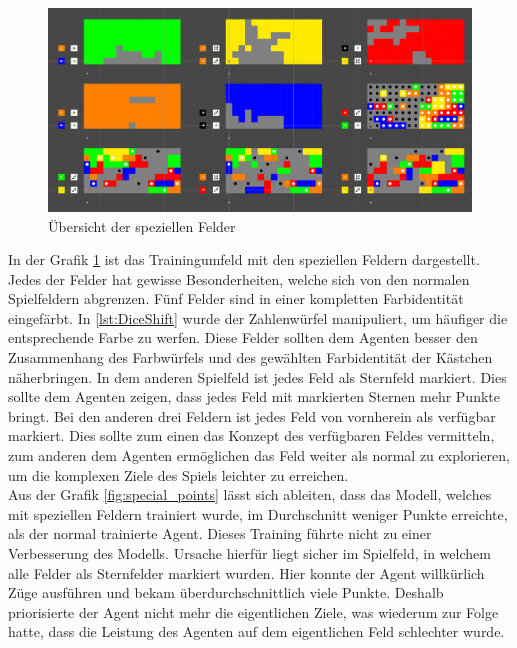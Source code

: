 \begin{figure}[!h]
    \centering
    \includegraphics[scale=0.4]{Bilder/specialFields.png}
    \caption{Übersicht der speziellen Felder}
    \label{fig:specialFields}
\end{figure}

In der Grafik \ref{fig:specialFields} ist das Trainingumfeld mit den speziellen Feldern dargestellt. Jedes der Felder hat gewisse Besonderheiten, welche sich von den normalen Spielfeldern abgrenzen.
Fünf Felder sind in einer kompletten Farbidentität eingefärbt. In \ref{lst:DiceShift} wurde der Zahlenwürfel manipuliert, um häufiger die entsprechende Farbe zu werfen. Diese Felder sollten dem Agenten besser den Zusammenhang des Farbwürfels und des gewählten Farbidentität der Kästchen näherbringen.
In dem anderen Spielfeld ist jedes Feld als Sternfeld markiert. Dies sollte dem Agenten zeigen, dass jedes Feld mit markierten Sternen mehr Punkte bringt.
Bei den anderen drei Feldern ist jedes Feld von vornherein als verfügbar markiert. Dies sollte zum einen das Konzept des verfügbaren Feldes vermitteln, zum anderen dem Agenten ermöglichen das Feld weiter als normal zu explorieren, um die komplexen Ziele des Spiels leichter zu erreichen. \\
Aus der Grafik \ref{fig:special_points} lässt sich ableiten, dass das Modell, welches mit speziellen Feldern trainiert wurde, im Durchschnitt weniger Punkte erreichte, als der normal trainierte Agent. Dieses Training führte nicht zu einer Verbesserung des Modells. Ursache hierfür liegt sicher im Spielfeld, in welchem alle Felder als Sternfelder markiert wurden. Hier konnte der Agent willkürlich Züge ausführen und bekam überdurchschnittlich viele Punkte. Deshalb priorisierte der Agent nicht mehr die eigentlichen Ziele, was wiederum zur Folge hatte, dass die Leistung des Agenten auf dem eigentlichen Feld schlechter wurde. 

